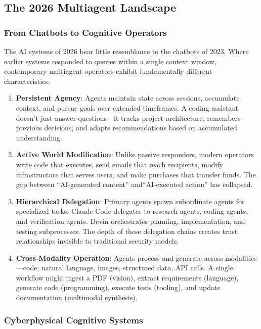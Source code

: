 \documentclass[
]{article}
\begin{document}
\subsection{The 2026 Multiagent Landscape}\label{sec:landscape}

\subsubsection{From Chatbots to Cognitive
Operators}\label{from-chatbots-to-cognitive-operators}

The AI systems of 2026 bear little resemblance to the chatbots of 2023.
Where earlier systems responded to queries within a single context
window, contemporary multiagent operators exhibit fundamentally
different characteristics:

\begin{enumerate}
\item \textbf{Persistent Agency}: Agents maintain state across sessions, accumulate context, and pursue goals over extended timeframes. A coding assistant doesn't just answer questions---it tracks project architecture, remembers previous decisions, and adapts recommendations based on accumulated understanding.

\item \textbf{Active World Modification}: Unlike passive responders, modern operators write code that executes, send emails that reach recipients, modify infrastructure that serves users, and make purchases that transfer funds. The gap between ``AI-generated content'' and``AI-executed action'' has collapsed.

\item \textbf{Hierarchical Delegation}: Primary agents spawn subordinate agents for specialized tasks. Claude Code delegates to research agents, coding agents, and verification agents. Devin orchestrates planning, implementation, and testing subprocesses. The depth of these delegation chains creates trust relationships invisible to traditional security models.

\item \textbf{Cross-Modality Operation}: Agents process and generate across modalities---code, natural language, images, structured data, API calls. A single workflow might ingest a PDF (vision), extract requirements (language), generate code (programming), execute tests (tooling), and update documentation (multimodal synthesis).
\end{enumerate}

\subsubsection{Cyberphysical Cognitive
Systems}\label{cyberphysical-cognitive-systems}
\end{document}
